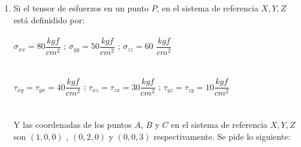 \documentclass[../notas medios.tex]{subfiles}
\begin{document}
\begin{enumerate}
\item \label{punto18} Si el tensor de esfuerzos en un punto $P$, en el sistema
de referencia $X,Y,Z$ est\'a definidido por:\\\\
\hspace*{10mm} $ \sigma_{xx} = 80\dfrac{kgf}{cm^2}$ \hspace*{5mm} ;   \hspace*{5mm} $\sigma_{yy} = 50\dfrac{kgf}{cm^2}$\hspace*{5mm} ;\hspace*{5mm} $\sigma_{zz} = 60$ $\dfrac{kgf}{cm^2}$\\\\
\\
	\hspace*{10mm}  $ \tau_{xy} = \tau_{yx} =40\dfrac{kgf}{cm^2}$ \hspace*{5mm}; \hspace*{5mm}$\tau_{xz} = \tau_{zx} =30\dfrac{kgf}{cm^2}$\hspace*{5mm} ;\hspace*{5mm} $\tau_{yz} = \tau_{zy} = 10 \dfrac{kgf}{cm^2}$\\\\	
\\	
Y las coordenadas de los puntos $A$, $B$ y $C$  en el sistema de referencia $X,Y,Z$  son   $(1,0,0)$ , $(0,2,0)$ y $(0,0,3)$  respectivamente. Se pide lo siguiente:


\end{enumerate}
\end{document}
